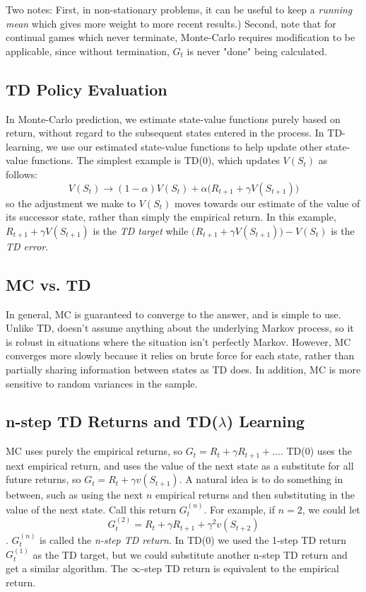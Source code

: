 \documentclass{article}
\newcommand{\ita}{\textit}
\begin{document}
Two notes: First, in non-stationary problems, it can be useful to keep a \ita{running mean} which gives more weight to more recent results.) Second, note that for continual games which never terminate, Monte-Carlo requires modification to be applicable, since without termination, $G_t$ is never "done" being calculated.

\subsection{TD Policy Evaluation}

In Monte-Carlo prediction, we estimate state-value functions purely based on return, without regard to the subsequent states entered in the process. In TD-learning, we use our estimated state-value functions to help update other state-value functions. The simplest example is TD(0), which updates $V(S_t)$ as follows:
$$V(S_t) \rightarrow (1-\alpha)V(S_t) + \alpha \bigg(R_{t+1} + \gamma V(S_{t+1})\bigg)$$
so the adjustment we make to $V(S_t)$ moves towards our estimate of the value of its successor state, rather than simply the empirical return. In this example, $R_{t+1} + \gamma V(S_{t+1})$ is the \ita{TD target} while $\bigg(R_{t+1} + \gamma V(S_{t+1})\bigg) - V(S_t)$ is the \ita{TD error}.

\subsection{MC vs. TD}

In general, MC is guaranteed to converge to the answer, and is simple to use. Unlike TD, doesn't assume anything about the underlying Markov process, so it is robust in situations where the situation isn't perfectly Markov. However, MC converges more slowly because it relies on brute force for each state, rather than partially sharing information between states as TD does. In addition, MC is more sensitive to random variances in the sample.

\subsection{n-step TD Returns and TD($\lambda$) Learning}

MC uses purely the empirical returns, so $G_t = R_t + \gamma R_{t+1} + \ldots$. TD(0) uses the next empirical return, and uses the value of the next state as a substitute for all future returns, so $G_t = R_t + \gamma v(S_{t+1})$. A natural idea is to do something in between, such as using the next $n$ empirical returns and then substituting in the value of the next state. Call this return $G^{(n)}_t$. For example, if $n = 2$, we could let $$G^{(2)}_t = R_t + \gamma R_{t+1} + \gamma^2 v(S_{t+2})$$. $G^{(n)}_t$ is called the \ita{n-step TD return}. In TD(0) we used the 1-step TD return $G^{(1)}_t$ as the TD target, but we could substitute another n-step TD return and get a similar algorithm. The $\infty$-step TD return is equivalent to the empirical return.
\end{document}
